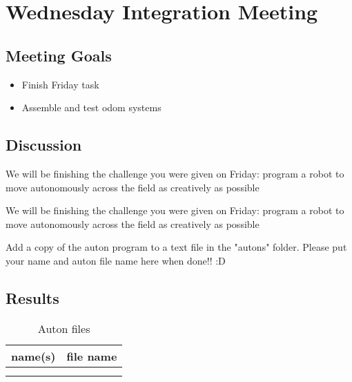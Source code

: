 \section{Wednesday Integration Meeting}

\subsection{Meeting Goals}
\begin{itemize}
    \item Finish Friday task
    \item Assemble and test odom systems
\end{itemize}

\subsection{Discussion}
We will be finishing the challenge you were given on Friday:
program a robot to move autonomously across the field as creatively as possible

We will be finishing the challenge you were given on Friday:
program a robot to move autonomously across the field as creatively as possible

Add a copy of the auton program to a text file in the "autons" folder.
Please put your name and auton file name here when done!! :D


\subsection{Results}
\begin{table}
    \centering
    \begin{tabular}{|c|c|}
        \hline
        name(s) & file name \\
        \hline
         &  \\
         &  \\
        \hline
    \end{tabular}
    \caption{Auton files}
    \label{tab:auton_files}
\end{table}